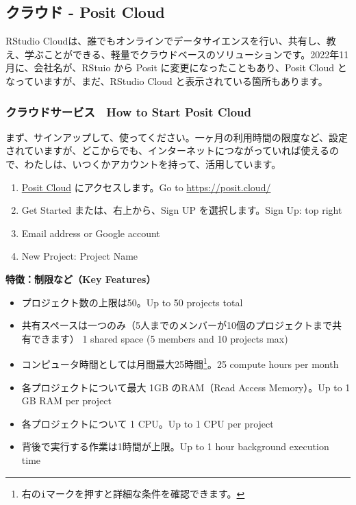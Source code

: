 \documentclass[
]{bxjsbook}
\providecommand{\tightlist}{%
  \setlength{\itemsep}{0pt}\setlength{\parskip}{0pt}}
\theoremstyle{definition}
\theoremstyle{definition}
\theoremstyle{definition}
\theoremstyle{definition}
\theoremstyle{remark}
\begin{document}
\hypertarget{ux30afux30e9ux30a6ux30c9---posit-cloud}{%
\subsection{クラウド - Posit Cloud}\label{ux30afux30e9ux30a6ux30c9---posit-cloud}}

RStudio Cloudは、誰でもオンラインでデータサイエンスを行い、共有し、教え、学ぶことができる、軽量でクラウドベースのソリューションです。2022年11月に、会社名が、RStuio から Posit に変更になったこともあり、Posit Cloud となっていますが、まだ、RStudio Cloud と表示されている箇所もあります。

\hypertarget{ux30afux30e9ux30a6ux30c9ux30b5ux30fcux30d3ux30b9-how-to-start-posit-cloud}{%
\subsubsection{クラウドサービス　How to Start Posit Cloud}\label{ux30afux30e9ux30a6ux30c9ux30b5ux30fcux30d3ux30b9-how-to-start-posit-cloud}}

まず、サインアップして、使ってください。一ヶ月の利用時間の限度など、設定されていますが、どこからでも、インターネットにつながっていれば使えるので、わたしは、いつくかアカウントを持って、活用しています。

\begin{enumerate}
\def\labelenumi{\arabic{enumi}.}
\tightlist
\item
  \href{https://posit.cloud/}{Posit Cloud} にアクセスします。Go to \url{https://posit.cloud/}
\item
  Get Started または、右上から、Sign UP を選択します。Sign Up: top right
\item
  Email address or Google account
\item
  New Project: Project Name
\end{enumerate}

\textbf{特徴：制限など（Key Features）}

\begin{itemize}
\tightlist
\item
  プロジェクト数の上限は50。Up to 50 projects total
\item
  共有スペースは一つのみ（5人までのメンバーが10個のプロジェクトまで共有できます） 1 shared space (5 members and 10 projects max)
\item
  コンピュータ時間としては月間最大25時間\footnote{右の\texttt{i}マークを押すと詳細な条件を確認できます。}。25 compute hours per month
\item
  各プロジェクトについて最大 1GB のRAM（Read Access Memory）。Up to 1 GB RAM per project
\item
  各プロジェクトについて 1 CPU。Up to 1 CPU per project
\item
  背後で実行する作業は1時間が上限。Up to 1 hour background execution time
\end{itemize}
\end{document}
